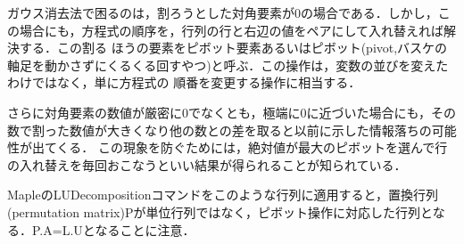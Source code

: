 ガウス消去法で困るのは，割ろうとした対角要素が0の場合である．しかし，この場合にも，方程式の順序を，行列の行と右辺の値をペアにして入れ替えれば解決する．この割る
ほうの要素をピボット要素あるいはピボット(pivot,バスケの軸足を動かさずにくるくる回すやつ)と呼ぶ．この操作は，変数の並びを変えたわけではなく，単に方程式の
順番を変更する操作に相当する．

さらに対角要素の数値が厳密に0でなくとも，極端に0に近づいた場合にも，その数で割った数値が大きくなり他の数との差を取ると以前に示した情報落ちの可能性が出てくる．
この現象を防ぐためには，絶対値が最大のピボットを選んで行の入れ替えを毎回おこなうといい結果が得られることが知られている．

MapleのLUDecompositionコマンドをこのような行列に適用すると，置換行列(permutation
matrix)Pが単位行列ではなく，ピボット操作に対応した行列となる．P.A=L.Uとなることに注意．